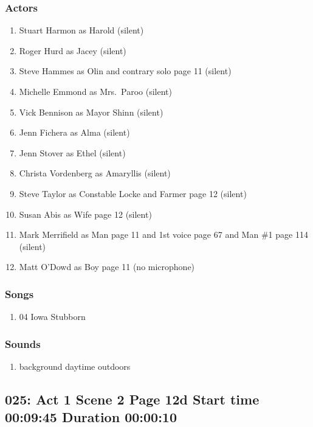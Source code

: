 \subsubsection{Actors}
\begin{enumerate}
\item Stuart Harmon as Harold (silent)
\item Roger Hurd as Jacey (silent)
\item Steve Hammes as Olin and contrary solo page 11 (silent)
\item Michelle Emmond as Mrs.~Paroo (silent)
\item Vick Bennison as Mayor Shinn (silent)
\item Jenn Fichera as Alma (silent)
\item Jenn Stover as Ethel (silent)
\item Christa Vordenberg as Amaryllis (silent)
\item Steve Taylor as Constable Locke and Farmer page 12 (silent)
\item Susan Abis as Wife page 12 (silent)
\item Mark Merrifield as Man page 11 and 1st voice page 67 and Man \#1 page 114 (silent)
\item Matt O'Dowd as Boy page 11 (no microphone)
\end{enumerate}

\subsubsection{Songs}
\begin{enumerate}
\item 04 Iowa Stubborn
\end{enumerate}\subsubsection{Sounds}
\begin{enumerate}
\item background daytime outdoors
\end{enumerate}
\subsection{025: Act 1 Scene 2 Page 12d Start time 00:09:45 Duration 00:00:10}

